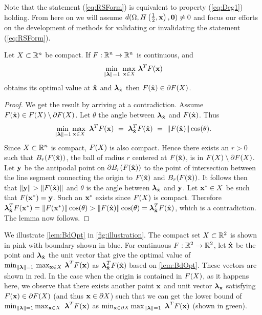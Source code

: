 Note that the statement (\ref{eq:RSForm}) is equivalent to property (\ref{eq:Deg1}) holding.
From here on we will assume $d(\Omega,H\left(\frac{1}{2},\mathbf{x}\right),\mathbf{0})\neq 0$ and focus our efforts on the development of methods for validating or invalidating the statement (\ref{eq:RSForm}).

\begin{lem} 
  \label{lem:BdOpt}
  Let $X\subset\mathbb{R}^n$ be compact. If $F:\mathbb{R}^n\rightarrow\mathbb{R}^n$ is continuous, and 
  \[
  \min\limits_{\lVert\boldsymbol{\lambda}\rVert=1} \, \max\limits_{\mathbf{x}\in X} \, \boldsymbol{\lambda}^TF(\mathbf{x})
  \]
  obtains its optimal value at $\hat{\mathbf{x}}$ and $\boldsymbol{\lambda}_{\hat{\mathbf{x}}}$ then $F(\hat{\mathbf{x}})\in \partial F(X)$. 
\end{lem}

\begin{proof} 
  We get the result by arriving at a contradiction.
  Assume $F(\hat{\mathbf{x}})\in F(X)\setminus\partial F(X)$. 
  Let $\theta$ the angle between $\boldsymbol{\lambda}_{\hat{\mathbf{x}}}$ and $F(\hat{\mathbf{x}})$. 
  Thus
  \[
  \min\limits_{\lVert\boldsymbol{\lambda}\rVert=1}\max\limits_{\mathbf{x}\in X}\ \boldsymbol{\lambda}^TF(\mathbf{x}) ~=~ \boldsymbol{\lambda}_{\hat{\mathbf{x}}}^TF(\hat{\mathbf{x}}) ~=~ \lVert F(\hat{\mathbf{x}})\rVert\cos(\theta).
  \]
  Since $X\subset\mathbb{R}^n$ is compact, $F(X)$ is also compact. 
  Hence there exists an $r>0$ such that  $B_r(F(\hat{\mathbf{x}}))$, the ball of radius $r$ centered at $F(\hat{\mathbf{x}})$, is in $F(X)\setminus\partial F(X)$. 
  Let $\mathbf{y}$ be the antipodal point on $\partial B_r(F(\hat{\mathbf{x}}))$ to the point of intersection between the line segment connecting the origin to $F(\hat{\mathbf{x}})$ and $B_r(F(\hat{\mathbf{x}}))$. 
  It follows then that $\lVert\mathbf{y}\rVert>\lVert F(\hat{\mathbf{x}})\rVert$ and $\theta$ is the angle between $\boldsymbol{\lambda}_{\hat{\mathbf{x}}}$ and $\mathbf{y}$.   
  Let $\mathbf{x}^*\in X$ be such that $F(\mathbf{x}^*)=\mathbf{y}$.
  Such an $\mathbf{x}^*$ exists since $F(X)$ is compact. 
  Therefore $\boldsymbol{\lambda}_{\hat{\mathbf{x}}}^TF(\mathbf{x}^*)=\lVert F(\mathbf{x}^*)\rVert \cos(\theta) > \lVert F(\hat{\mathbf{x}})\rVert \cos(\theta) = \boldsymbol{\lambda}_{\hat{\mathbf{x}}}^TF(\hat{\mathbf{x}})$, which is a contradiction. 
  The lemma now follows.
\end{proof}

We illustrate \cref{lem:BdOpt} in \cref{fig:illustration}.
The compact set $X\subset\mathbb{R}^2$ is shown in pink with boundary shown in blue.
For continuous $F:\mathbb{R}^2 \rightarrow \mathbb{R}^2$, let $\hat{\mathbf{x}}$ be the point and $\boldsymbol{\lambda}_{\hat{\mathbf{x}}}$ the unit vector that give the optimal value of $\min_{\lVert\boldsymbol{\lambda}\rVert=1} \, \max_{\mathbf{x}\in X} \, \boldsymbol{\lambda}^TF(\mathbf{x})$ as $\boldsymbol{\lambda}_{\hat{\mathbf{x}}}^TF(\hat{\mathbf{x}})$ based on \cref{lem:BdOpt}.
These vectors are shown in red.
In the case when the origin is contained in $F(X)$, as it happens here, we observe that there exists another point $\mathbf{x}$ and unit vector $\boldsymbol{\lambda}_{\mathbf{x}}$ satisfying $F(\mathbf{x}) \in \partial F(X)$ (and thus $\mathbf{x}\in \partial X$) such that we can get the lower bound of $\min_{\norm{\vlambda}=1}\max_{\vx\in X}\ \vlambda^T\vF(\vx)$ as $\min_{\mathbf{x}\in \partial X} \max_{\lVert\boldsymbol{\lambda}\rVert=1}\ \boldsymbol{\lambda}^TF(\mathbf{x})$ (shown in green).

